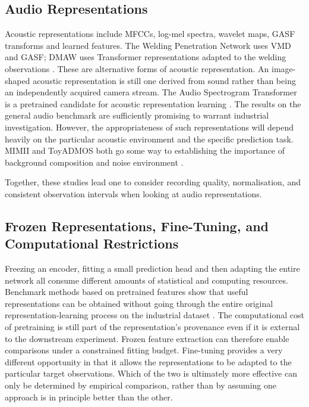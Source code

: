 \subsection{Audio Representations}

Acoustic representations include MFCCs, log-mel spectra, wavelet maps, GASF transforms and learned
features.
The Welding Penetration Network uses VMD and GASF; DMAW uses Transformer representations adapted to
the welding observations \parencite{Hua2026Weld,P003}.
These are alternative forms of acoustic representation. An image-shaped acoustic representation is
still one derived from sound rather than being an independently acquired camera stream.
The Audio Spectrogram Transformer is a pretrained candidate for acoustic representation learning
\parencite{P011}. The results on the general audio benchmark are sufficiently promising to warrant
industrial investigation. However, the appropriateness of such representations will depend heavily
on the particular acoustic environment and the specific prediction task.
MIMII and ToyADMOS both go some way to establishing the importance of background composition and
noise environment \parencite{Purohit2019MIMII,Koizumi2019ToyADMOS}.

Together, these studies lead one to consider recording quality, normalisation, and consistent
observation intervals when looking at audio representations.

\subsection{Frozen Representations, Fine-Tuning, and Computational Restrictions}

Freezing an encoder, fitting a small prediction head and then adapting the entire network all
consume different amounts of statistical and computing resources.
Benchmark methods based on pretrained features show that useful representations can be obtained without
going through the entire original representation-learning process on the industrial dataset
\parencite{Roth2022Towards,Costanzino2024Multimodal}.
The computational cost of pretraining is still part of the representation's provenance even if it is
external to the downstream experiment.
Frozen feature extraction can therefore enable comparisons under a constrained fitting budget.
Fine-tuning provides a very different opportunity in that it allows the representations to be adapted
to the particular target observations. Which of the two is ultimately more effective can only be
determined by empirical comparison, rather than by assuming one approach is in principle better than
the other.

